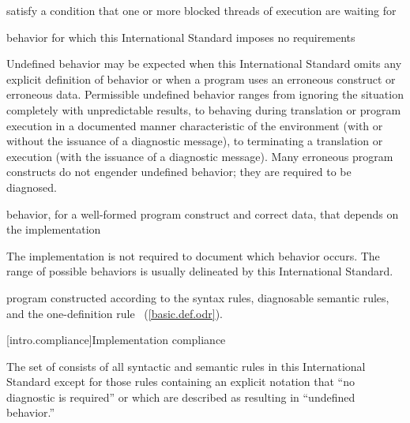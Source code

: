 %
satisfy a condition that one or more blocked threads of execution are waiting for

%
behavior for which this International Standard
imposes no requirements\\
\begin{note} Undefined behavior may be expected when
this International Standard omits any explicit
definition of behavior or when a program uses an erroneous construct or erroneous data.
Permissible undefined behavior ranges
from ignoring the situation completely with unpredictable results, to
behaving during translation or program execution in a documented manner
characteristic of the environment (with or without the issuance of a
diagnostic message), to terminating a translation or execution (with the
issuance of a diagnostic message). Many erroneous program constructs do
not engender undefined behavior; they are required to be diagnosed.
\end{note}

%
behavior, for a well-formed program construct and correct data, that
depends on the implementation\\
\begin{note} The implementation is not required to
document which behavior occurs. The range of
possible behaviors is usually delineated by this International Standard.
\end{note}

%
\Cpp  program constructed according to the syntax rules, diagnosable
semantic rules, and the one-definition rule ~(\ref{basic.def.odr}).%

[intro.compliance]{Implementation compliance}

\pnum
{}%
%
The set of
consists of all syntactic and semantic rules in this International
Standard except for those rules containing an explicit notation that
``no diagnostic is required'' or which are described as resulting in
``undefined behavior.''

